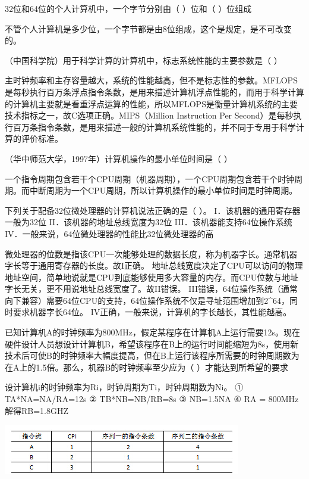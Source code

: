\question 32位和64位的个人计算机中，一个字节分别由（ ）位和（ ）位组成
\par{}
\begin{solution}不管个人计算机是多少位，一个字节都是由8位组成，这个是规定，是不可改变的。
\end{solution}
\question （中国科学院）用于科学计算的计算机中，标志系统性能的主要参数是（ ）
\par{}
\begin{solution}主时钟频率和主存容量越大，系统的性能越高，但不是标志性的参数。MFLOPS是每秒执行百万条浮点指令条数，是用来描述计算机浮点性能的，而用于科学计算的计算机主要就是看重浮点运算的性能，所以MFLOPS是衡量计算机系统的主要技术指标之一，故C选项正确。MIPS（Million
Instruction Per
Second）是每秒执行百万条指令条数，是用来描述一般的计算机系统性能的，并不同于专用于科学计算的评价标准。
\end{solution}
\question （华中师范大学，1997年）计算机操作的最小单位时间是（ ）
\par{}
\begin{solution}一个指令周期包含若干个CPU周期（机器周期），一个CPU周期包含若干个时钟周期。而中断周期为一个CPU周期，所以计算机操作的最小单位时间是时钟周期。
\end{solution}
\question 下列关于配备32位微处理器的计算机说法正确的是（ ）。
I．该机器的通用寄存器一般为32位 II．该机器的地址总线宽度为32位
III．该机器能支持64位操作系统
IV．一般来说，64位微处理器的性能比32位微处理器的高
\par{}
\begin{solution}微处理器的位数是指该CPU一次能够处理的数据长度，称为机器字长。通常机器字长等于通用寄存器的长度。故I正确。
地址总线宽度决定了CPU可以访问的物理地址空间，简单地说就是CPU到底能够使用多大容量的内存。而CPU位数与地址字长无关，更不用说地址总线宽度了。故II错误。
III错误，64位操作系统（通常向下兼容）需要64位CPU的支持，64位操作系统不仅是寻址范围增加到2\^{}64，同时要求机器字长64位。
IV正确，一般来说，计算机的字长越长，其性能越高。
\end{solution}
\question 已知计算机A的时钟频率为800MHz，假定某程序在计算机A上运行需要12s。现在硬件设计人员想设计计算机B，希望该程序在B上的运行时间能缩短为8s，使用新技术后可使B的时钟频率大幅度提高，但在B上运行该程序所需要的时钟周期数为在A上的1.5倍。那么，机器B的时钟频率至少应为（
）才能达到所希望的要求
\par{}
\begin{solution}设计算机i的时钟频率为Ri，时钟周期为Ti，时钟周期数为Ni。 ①
TA*NA=NA/RA=12s ② TB*NB=NB/RB=8s ③ NB=1.5NA ④ RA = 800MHz 解得RB=1.8GHZ
\end{solution}
\question \includegraphics[width=4.09375in,height=0.86458in]{computerassets/f1ee365e16cc158b8b116a176c44b5d2.jpeg}

